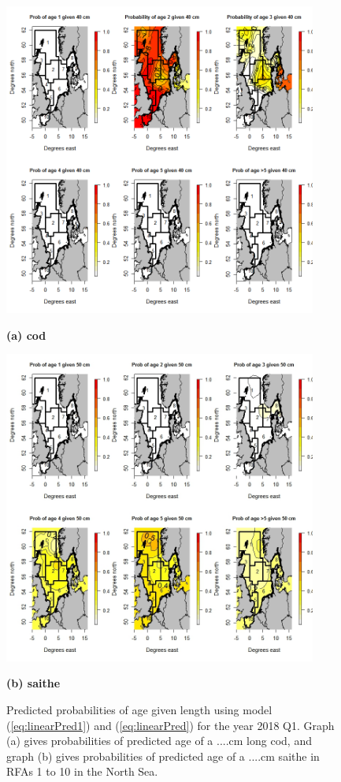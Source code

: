 \documentclass[a4paper 12pt]{article}
\numberwithin{equation}{section}
\begin{document}
\clearpage
\begin{figure}[h!]
\centering
\begin{minipage}[c]{0.50\linewidth}
\includegraphics[width=103mm,scale=7.5]{Allcode40cm2015.png}
\caption*{\bf (a) cod}
\label{fig1.1}
\end{minipage}

\quad
\begin{minipage}[c]{0.50\linewidth}
\includegraphics[width=103mm,scale=7.5]{saithe2015Q1Map.jpeg}
\caption*{\bf (b) saithe}
\label{fig5.1}
\end{minipage}
 \caption{Predicted probabilities of age given length using model (\ref{eq:linearPred1}) and (\ref{eq:linearPred}) for the year 2018 Q1. Graph (a) gives probabilities of predicted age of a ....cm long cod, and graph (b) gives probabilities of predicted age of a ....cm saithe in RFAs 1 to 10 in the North Sea.}
  \label{predictedprobabilitiesplot}
\end{figure}
\end{document}
